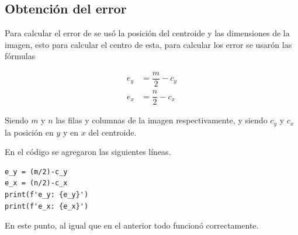 \documentclass[12pt, oneside]{article}
\begin{document}
\subsection{Obtención del error}
{\sffamily\large\justify
    \hspace{0.5cm} Para calcular el error de se usó la posición del centroide y las
    dimensiones de la imagen, esto para calcular el centro de esta, para calcular los
    error se usarón las fórmulas

    \begin{equation*}
        \begin{split}
            e_y & = \dfrac{m}{2} - c_y \\
            e_x & = \dfrac{n}{2} - c_x
        \end{split}
    \end{equation*}

    \hspace{0.5cm} Siendo $m$ y $n$ las filas y columnas de la imagen respectivamente,
    y siendo $c_y$ y $c_x$ la posición en $y$ y en $x$ del centroide.

    \hspace{0.5cm} En el código se agregaron las siguientes líneas.

    \lstset{style=pythonScript}
    \begin{lstlisting}
e_y = (m/2)-c_y
e_x = (n/2)-c_x
print(f'e_y: {e_y}')
print(f'e_x: {e_x}')
    \end{lstlisting}

    \hspace{0.5cm} En este punto, al igual que en el anterior todo funcionó
    correctamente.

}
\end{document}
